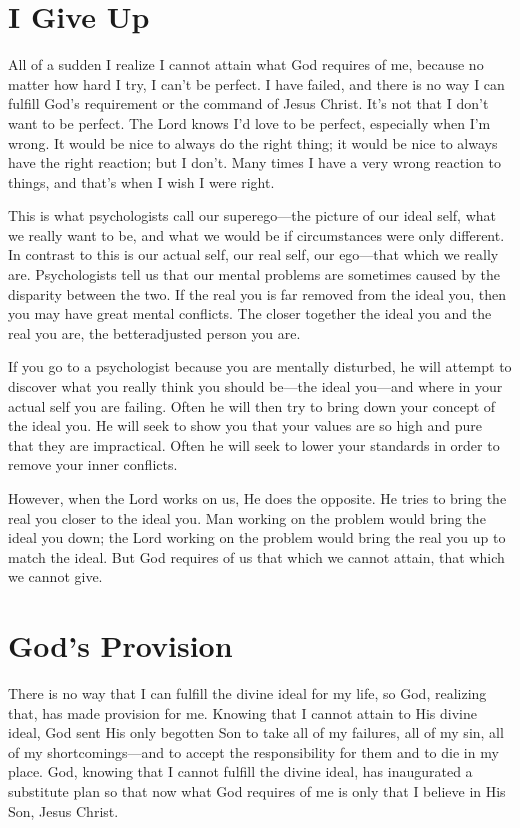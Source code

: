 \section*{I Give Up}

All of a sudden I realize I cannot attain what God
requires of me, because no matter how hard I try, I can’t be
perfect. I have failed, and there is no way I can fulfill God’s
requirement or the command of Jesus Christ. It’s not that I
don’t want to be perfect. The Lord knows I’d love to be perfect,
especially when I’m wrong. It would be nice to always
do the right thing; it would be nice to always have the right
reaction; but I don’t. Many times I have a very wrong reaction
to things, and that’s when I wish I were right.

This is what psychologists call our superego—the picture
of our ideal self, what we really want to be, and what
we would be if circumstances were only different. In contrast
to this is our actual self, our real self, our ego—that
which we really are. Psychologists tell us that our mental
problems are sometimes caused by the disparity between
the two. If the real you is far removed from the ideal
you, then you may have great mental conflicts. The closer
together the ideal you and the real you are, the betteradjusted
person you are.

If you go to a psychologist because you are mentally
disturbed, he will attempt to discover what you really think
you should be—the ideal you—and where in your actual
self you are failing. Often he will then try to bring down
your concept of the ideal you. He will seek to show you
that your values are so high and pure that they are impractical.
Often he will seek to lower your standards in order to
remove your inner conflicts.

However, when the Lord works on us, He does the
opposite. He tries to bring the real you closer to the ideal
you. Man working on the problem would bring the ideal
you down; the Lord working on the problem would bring
the real you up to match the ideal. But God requires of us
that which we cannot attain, that which we cannot give.


\section*{God's Provision}

There is no way that I can fulfill the divine ideal for
my life, so God, realizing that, has made provision for me.
Knowing that I cannot attain to His divine ideal, God sent
His only begotten Son to take all of my failures, all of my
sin, all of my shortcomings—and to accept the responsibility
for them and to die in my place. God, knowing that I
cannot fulfill the divine ideal, has inaugurated a substitute
plan so that now what God requires of me is only that I
believe in His Son, Jesus Christ.

